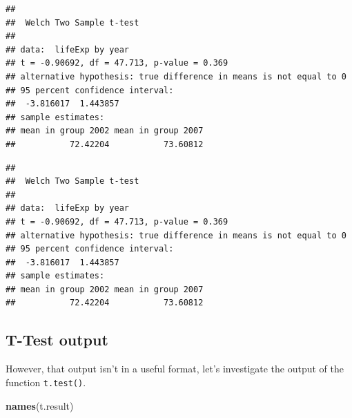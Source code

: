 \documentclass[]{book}
\makeatletter
\newenvironment{Shaded}{\begin{snugshade}}{\end{snugshade}}
\newcommand{\DataTypeTok}[1]{\textcolor[rgb]{0.13,0.29,0.53}{#1}}
\newcommand{\DecValTok}[1]{\textcolor[rgb]{0.00,0.00,0.81}{#1}}
\newcommand{\KeywordTok}[1]{\textcolor[rgb]{0.13,0.29,0.53}{\textbf{#1}}}
\newcommand{\NormalTok}[1]{#1}
\newcommand{\OperatorTok}[1]{\textcolor[rgb]{0.81,0.36,0.00}{\textbf{#1}}}
\newcommand{\StringTok}[1]{\textcolor[rgb]{0.31,0.60,0.02}{#1}}
\newenvironment{kframe}{%
\medskip{}
\setlength{\fboxsep}{.8em}
 \def\at@end@of@kframe{}%
 \ifinner\ifhmode%
  \def\at@end@of@kframe{\end{minipage}}%
  \begin{minipage}{\columnwidth}%
 \fi\fi%
 \def\FrameCommand##1{\hskip\@totalleftmargin \hskip-\fboxsep
 \colorbox{shadecolor}{##1}\hskip-\fboxsep
     \hskip-\linewidth \hskip-\@totalleftmargin \hskip\columnwidth}%
 \MakeFramed {\advance\hsize-\width
   \@totalleftmargin\z@ \linewidth\hsize
   \@setminipage}}%
 {\par\unskip\endMakeFramed%
 \at@end@of@kframe}
\renewenvironment{Shaded}{\begin{kframe}}{\end{kframe}}
\theoremstyle{definition}
\theoremstyle{definition}
\theoremstyle{definition}
\theoremstyle{remark}
\makeatother
\begin{document}
\begin{verbatim}
## 
##  Welch Two Sample t-test
## 
## data:  lifeExp by year
## t = -0.90692, df = 47.713, p-value = 0.369
## alternative hypothesis: true difference in means is not equal to 0
## 95 percent confidence interval:
##  -3.816017  1.443857
## sample estimates:
## mean in group 2002 mean in group 2007 
##           72.42204           73.60812
\end{verbatim}

\begin{Shaded}
\end{Shaded}

\begin{verbatim}
## 
##  Welch Two Sample t-test
## 
## data:  lifeExp by year
## t = -0.90692, df = 47.713, p-value = 0.369
## alternative hypothesis: true difference in means is not equal to 0
## 95 percent confidence interval:
##  -3.816017  1.443857
## sample estimates:
## mean in group 2002 mean in group 2007 
##           72.42204           73.60812
\end{verbatim}

\hypertarget{t-test-output}{%
\subsection{T-Test output}\label{t-test-output}}

However, that output isn't in a useful format, let's investigate the
output of the function \texttt{t.test()}.

\begin{Shaded}
\begin{Highlighting}[]
\KeywordTok{names}\NormalTok{(t.result)}
\end{Highlighting}
\end{Shaded}
\end{document}
